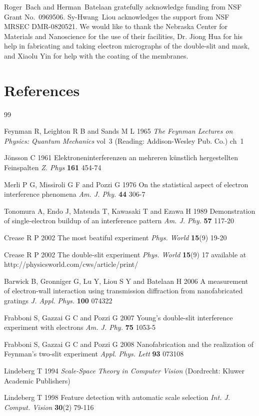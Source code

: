 \documentclass[12pt]{iopart}					%
\begin{document}
\ack
Roger~Bach and Herman~Batelaan gratefully acknowledge funding from NSF Grant No.~0969506.
Sy-Hwang~Liou acknowledges the support from NSF MRSEC DMR-0820521.
We would like to thank the Nebraska Center for Materials and Nanoscience for the use of their facilities, 
Dr. Jiong Hua for his help in fabricating and taking electron micrographs of the double-slit and mask,
and Xiaolu Yin for help with the coating of the membranes.

\section*{References}
\begin{thebibliography}{99}

 Feynman R, Leighton R B and Sands M L 1965 {\it The Feynman Lectures on Physics: Quantum Mechanics} vol~3 (Reading: Addison-Wesley Pub. Co.) ch~1

 J\"{o}nsson C 1961 {Elektroneninterferenzen an mehreren k\"{u}nstlich hergestellten {F}einspalten} {\it Z. Phys} {\bf 161} 454-74

 Merli P G, Missiroli G F and Pozzi G 1976 {On the statistical aspect of electron interference phenomena} {\it Am. J. Phy.} {\bf 44} 306-7

 Tonomura A, Endo J, Matsuda T, Kawasaki T and Ezawa H 1989 {Demonstration of single-electron buildup of an interference pattern} {\it Am. J. Phy.} {\bf 57} 117-20

 Crease R P 2002 {The most beatiful experiment} {\it Phys. World} {\bf 15}(9) 19-20

 Crease R P 2002 {The double-slit experiment} {\it Phys. World} {\bf 15}(9) 17 available at http:/\allowbreak /\allowbreak physicsworld.\allowbreak com/\allowbreak cws/\allowbreak article/\allowbreak print/ 

 Barwick B, Gronniger G, Lu Y, Liou S Y and Batelaan H 2006 {A measurement of electron-wall interaction using transmission diffraction from nanofabricated gratings} {\it J. Appl. Phys.} {\bf 100} 074322

 Frabboni S, Gazzai G C and Pozzi G 2007 {Young's double-slit interference experiment with electrons} {\it Am. J. Phy.} {\bf 75} 1053-5

 Frabboni S, Gazzai G C and Pozzi G 2008 {Nanofabrication and the realization of {Feynman's} two-slit experiment} {\it Appl. Phys. Lett} {\bf 93} 073108

 Lindeberg T 1994 {\it Scale-Space Theory in Computer Vision} (Dordrecht: Kluwer Academic Publishers)

 Lindeberg T 1998 {Feature detection with automatic scale selection} {\it Int. J. Comput. Vision} {\bf 30}(2) 79-116

\end{thebibliography}
\end{document}
